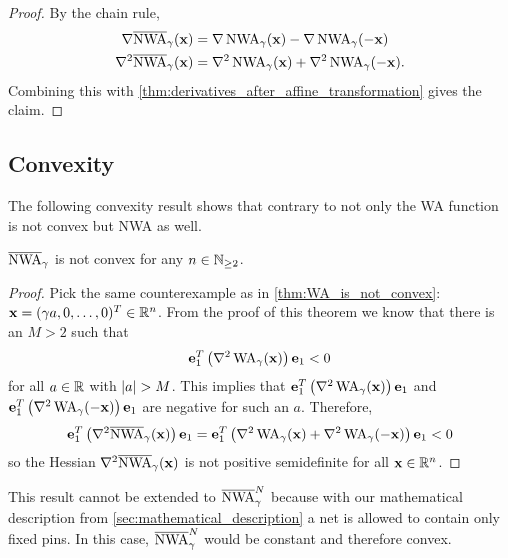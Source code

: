 \begin{proof}
 By the chain rule, 
 \begin{align*}
  \nabla \overline{\operatorname{NWA}}_\gamma (\mathbf{x})   &= \nabla \operatorname{NWA}_{\gamma}(\mathbf{x}) - \nabla \operatorname{NWA}_{\gamma}(-\mathbf{x}) \\
  \nabla^2 \overline{\operatorname{NWA}}_\gamma (\mathbf{x}) &= \nabla^2 \operatorname{NWA}_{\gamma}(\mathbf{x}) + \nabla^2 \operatorname{NWA}_{\gamma}(-\mathbf{x}) .
 \end{align*}
 Combining this with \cref{thm:derivatives_after_affine_transformation} gives the claim.
\end{proof}



\subsection{Convexity} \label{sec:NWA_convexity}

The following convexity result shows that contrary to \cite{HsuChangBalabanov-AnalyticalPlacementFor3dIcDesigns}
not only the WA function is not convex but NWA as well.

\begin{corollary} \label{thm:NWA_is_not_convex}
 \(\overline{\operatorname{NWA}}_\gamma\) is not convex for any \(n \in \mathbb{N}_{\geq 2}\).
\end{corollary}

\begin{proof}
 Pick the same counterexample as in \cref{thm:WA_is_not_convex}: \(\mathbf{x} = ( \gamma a, 0, \ldots, 0)^T \in \mathbb{R}^n\).
 From the proof of this theorem we know that there is an \(M > 2\) such that
 \[ \mathbf{e}_1^T \left({ \nabla^2 \operatorname{WA}_\gamma(\mathbf{x}) }\right) \mathbf{e}_1 < 0\]
 for all \(a \in \mathbb{R}\) with \(\lvert a\rvert > M\).
 This implies that 
 \(\mathbf{e}_1^T \left({ \nabla^2 \operatorname{WA}_\gamma(\mathbf{x}) }\right) \mathbf{e}_1\) and
 \(\mathbf{e}_1^T \left({ \nabla^2 \operatorname{WA}_\gamma(-\mathbf{x}) }\right) \mathbf{e}_1\)
 are negative for such an \(a\).
 Therefore,
 \[ \mathbf{e}_1^T \left({ \nabla^2 \overline{\operatorname{NWA}}_\gamma(\mathbf{x}) }\right) \mathbf{e}_1 = \mathbf{e}_1^T \left({ \nabla^2 \operatorname{WA}_\gamma(\mathbf{x}) + \nabla^2 \operatorname{WA}_\gamma(-\mathbf{x}) }\right) \mathbf{e}_1 < 0 \]
 so the Hessian \(\nabla^2 \overline{\operatorname{NWA}}_\gamma(\mathbf{x})\) is not positive semidefinite for all \(\mathbf{x} \in \mathbb{R}^n\).
\end{proof}


\begin{remark}
 This result cannot be extended to \(\overline{\operatorname{NWA}}_\gamma^N\) because with our mathematical description from \cref{sec:mathematical_description}
 a net is allowed to contain only fixed pins.
 In this case, \(\overline{\operatorname{NWA}}_\gamma^N\) would be constant and therefore convex.
\end{remark}


